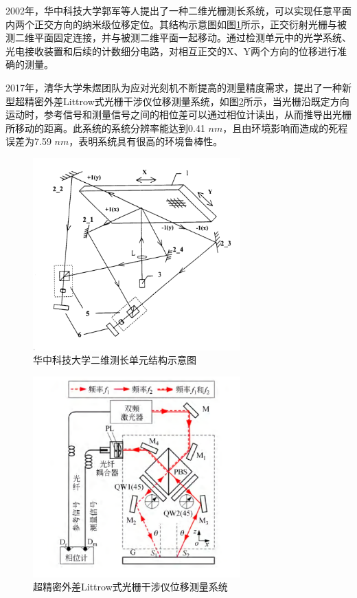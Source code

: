 \documentclass[type=master,oneside]{fduthesis}
\begin{document}
2002年，华中科技大学郭军\cite{郭军0一种二维测长单元}等人提出了一种二维光栅测长系统，可以实现任意平面内两个正交方向的纳米级位移定位。其结构示意图如图\ref{fig:华中科技大学二维测长单元结构示意图}所示，正交衍射光栅与被测二维平面固定连接，并与被测二维平面一起移动。通过检测单元中的光学系统、光电接收装置和后续的计数细分电路，对相互正交的X、Y两个方向的位移进行准确的测量。

2017年，清华大学朱煜团队\cite{王磊杰2017超精密外差利特罗式光栅干涉仪位移测量系统,ye2019ultraprecision,ye2018translational}为应对光刻机不断提高的测量精度需求，提出了一种新型超精密外差Littrow式光栅干涉仪位移测量系统，如图\ref{fig:超精密外差利特罗式光栅干涉仪位移测量系统}所示，当光栅沿既定方向运动时，参考信号和测量信号之间的相位差可以通过相位计读出，从而推导出光栅所移动的距离。此系统的系统分辨率能达到0.41 $nm$，且由环境影响而造成的死程误差为7.59 $nm$，表明系统具有很高的环境鲁棒性。


\begin{figure}[htb]
  \centering
  \includegraphics[width=8cm]{1-fig/华中科技大学.png}
  \caption{华中科技大学二维测长单元结构示意图}
  \label{fig:华中科技大学二维测长单元结构示意图}
\end{figure}

\begin{figure}[htb]
  \centering
  \includegraphics[width=8cm]{1-fig/清华大学.png}
  \caption{超精密外差Littrow式光栅干涉仪位移测量系统}
  \label{fig:超精密外差利特罗式光栅干涉仪位移测量系统}
\end{figure}
\end{document}

